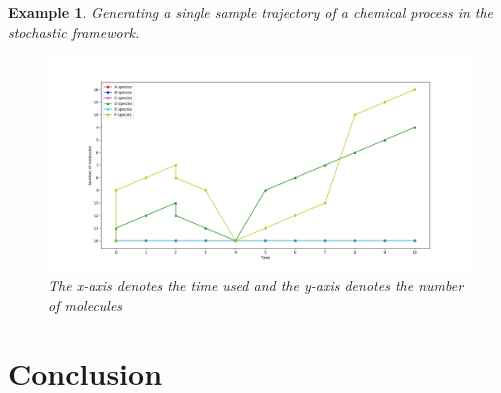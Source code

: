 \documentclass[11pt,a4paper]{article}
\newtheorem{example}[theorem]{Example}
\begin{document}
\begin{example}{Generating a single sample trajectory of a chemical process in the stochastic framework.}
    \begin{figure}[!h]
    \centering
    \includegraphics[width=1\textwidth]{Images/Figure_5_Next_reaction.png}
    \caption{The x-axis denotes the time used and the y-axis denotes the number of molecules}
    \label{fig: Single sample trajectory}
    \end{figure}
\end{example}

\section{Conclusion}

\newpage


\end{document}
